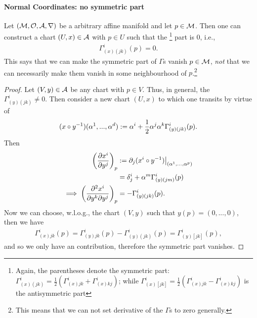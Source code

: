 \documentclass[12pt]{article} %
\begin{document}
\paragraph{Normal Coordinates: no symmetric part}
Let $(\mathcal{M},\mathcal{O},\mathcal{A},\nabla)$ be a arbitrary affine manifold and let $p\in\mathcal{M}$. Then one can construct a chart $(U,x)\in\mathcal{A}$ with $p\in U$ such that  the \footnote{Again, the parentheses denote the symmetric part: $\Gamma^i_{(x)(jk)} = \frac{1}{2}(\Gamma^i_{(x)jk} + \Gamma^i_{(x)kj})$; while $\Gamma^i_{(x)[jk]} = \frac{1}{2}(\Gamma^i_{(x)jk} - \Gamma^i_{(x)kj})$ is the antisymmetric part}   part is $0$, i.e.,
\begin{align*} 
    \Gamma^i_{(x)(jk)}(p) = 0.
\end{align*} 
This says that we can make the symmetric part of  $\Gamma$s vanish  $p\in\mathcal{M}$, \textit{not} that we can necessarily make them vanish in some neighbourhood of $p$.\footnote{This means that we can not set derivative of the $\Gamma$s to zero generally.}

\begin{proof}
Let $(V,y)\in\mathcal{A}$ be any chart with $p\in V$. Thus, in general, the $\Gamma^i_{(y)(jk)}\neq 0$. Then consider a new chart $(U,x)$ to which one transits by virtue of 
    \begin{align*} 
        (x\circ y^{-1})(\alpha^1,...,\alpha^d) := \alpha^i + \frac{1}{2}\alpha^j\alpha^k\Gamma^i_{(y)(jk)}(p).
    \end{align*} 
    Then
    \begin{align*} 
        \begin{split}
            \bigg(\frac{\partial x^i}{\partial y^j}\bigg)_p & := \partial_j(x^i\circ y^{-1})\big|_{(\alpha^1,...,\alpha^p)} \\
            & = \delta^i_j + \alpha^m\Gamma^i_{(y)(jm)}(p) \\ 
            \implies \bigg( \frac{\partial^2 x^i}{\partial y^k \partial y^j}\bigg)_p & = - \Gamma^i_{(y)(jk)}(p).
        \end{split}
    \end{align*} 
    Now we can choose, w.l.o.g., the chart $(V,y)$ such that $y(p)= (0,...,0)$, then we have 
    \begin{align*} 
        \Gamma^i_{(x)jk}(p) = \Gamma^i_{(y)jk}(p) - \Gamma^i_{(y)(jk)}(p) = \Gamma^i_{(y)[jk]}(p),
    \end{align*} 
    and so we only have an  contribution, therefore the symmetric part vanishes.
\end{proof}
\end{document}
